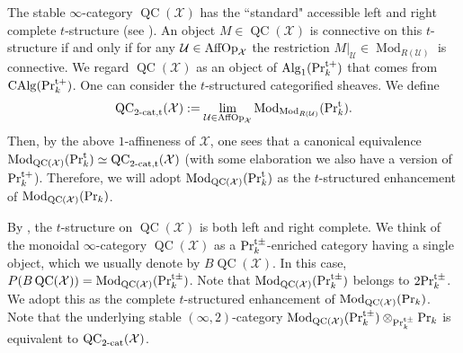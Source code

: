 \documentclass[leqno,12pt]{amsart}
\theoremstyle{plain}
\theoremstyle{definition}
\newcommand{\PR}{\textup{Pr}}
\newcommand{\PRT}{\textup{Pr}^{\textup{t}}}
\newcommand{\PRTT}{\textup{Pr}^{\textup{t}+}}
\newcommand{\PRTTT}{\textup{Pr}^{\textup{t}\pm}}
\newcommand{\Mod}{\operatorname{Mod}}
\newcommand{\Alg}{\operatorname{Alg}}
\newcommand{\CAlg}{\operatorname{CAlg}}
\newcommand{\QC}{\operatorname{QC}}
\newcommand{\XX}{\mathcal{X}}
\begin{document}
The stable $\infty$-category  $\QC(\XX)$  has the ``standard" accessible left and right complete $t$-structure (see \cite[VIII, Proposition 2.3.16, Proposition 2.3.18]{DAG}).
An object $M\in \QC(\XX)$ is connective on this $t$-structure if and only if for any $\mathcal{U}\in\textup{AffOp}_{\XX}$ the restriction $M|_{\mathcal{U}}\in \Mod_{R(\mathcal{U})}$
is connective. 
We regard $\QC(\mathcal{X})$ as an object of $\Alg_1(\PRTT_k)$ that comes from $\CAlg(\PRTT_k)$.
One can consider the $t$-structured categorified sheaves.
We define
\[
\textup{QC}_{\textup{2-cat,t}}(\XX):=\lim_{\mathcal{U}\in \textup{AffOp}_{\XX}}\Mod_{\Mod_{R(\mathcal{U})}}(\PRT_k).
\]
Then, by the above $1$-affineness of $\XX$, one sees that a canonical equivalence 
$\Mod_{\QC(\XX)}(\PRT_k)\simeq \textup{QC}_{\textup{2-cat,t}}(\XX)$ (with some elaboration we also have a version of $\PRTT_k$). 
Therefore, we will adopt $\Mod_{\QC(\XX)}(\PRT_k)$ as the $t$-structured enhancement of  $\Mod_{\QC(\XX)}(\PR_k)$.

By \cite[VIII, Proposition 2.3.18]{DAG}, the $t$-structure on $\QC(\XX)$ is both left and right complete. 
We think of the monoidal $\infty$-category $\QC(\mathcal{X})$ as a $\PRTTT_k$-enriched category having a single object,
which we usually denote by $B\QC(\mathcal{X})$.
In this case, $P(B\QC(\mathcal{X}))=\Mod_{\QC(\mathcal{X})}(\PRTTT_k)$. Note that $\Mod_{\QC(\mathcal{X})}(\PRTTT_k)$ belongs to $2\PRTTT_k$.
We adopt this as the complete $t$-structured enhancement of  $\Mod_{\QC(\XX)}(\PR_k)$.
Note that the underlying stable $(\infty,2)$-category
$\Mod_{\QC(\mathcal{X})}(\PRTTT_k)\otimes_{\PRTTT_k}\PR_k$ is equivalent to $\textup{QC}_{\textup{2-cat}}(\XX)$.
\end{document}
